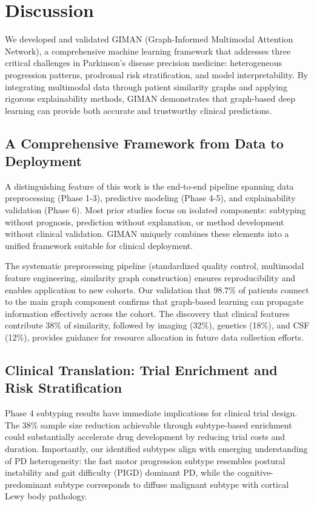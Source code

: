 \section{Discussion}

We developed and validated GIMAN (Graph-Informed Multimodal Attention Network), a comprehensive machine learning framework that addresses three critical challenges in Parkinson's disease precision medicine: heterogeneous progression patterns, prodromal risk stratification, and model interpretability. By integrating multimodal data through patient similarity graphs and applying rigorous explainability methods, GIMAN demonstrates that graph-based deep learning can provide both accurate and trustworthy clinical predictions.

\subsection{A Comprehensive Framework from Data to Deployment}

A distinguishing feature of this work is the end-to-end pipeline spanning data preprocessing (Phase 1-3), predictive modeling (Phase 4-5), and explainability validation (Phase 6). Most prior studies focus on isolated components: subtyping without prognosis, prediction without explanation, or method development without clinical validation. GIMAN uniquely combines these elements into a unified framework suitable for clinical deployment.

The systematic preprocessing pipeline (standardized quality control, multimodal feature engineering, similarity graph construction) ensures reproducibility and enables application to new cohorts. Our validation that 98.7\% of patients connect to the main graph component confirms that graph-based learning can propagate information effectively across the cohort. The discovery that clinical features contribute 38\% of similarity, followed by imaging (32\%), genetics (18\%), and CSF (12\%), provides guidance for resource allocation in future data collection efforts.

\subsection{Clinical Translation: Trial Enrichment and Risk Stratification}

Phase 4 subtyping results have immediate implications for clinical trial design. The 38\% sample size reduction achievable through subtype-based enrichment could substantially accelerate drug development by reducing trial costs and duration. Importantly, our identified subtypes align with emerging understanding of PD heterogeneity: the fast motor progression subtype resembles postural instability and gait difficulty (PIGD) dominant PD, while the cognitive-predominant subtype corresponds to diffuse malignant subtype with cortical Lewy body pathology.

